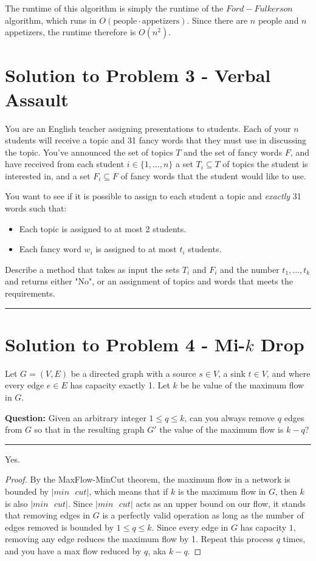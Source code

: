 \documentclass[11pt]{article}
\begin{document}
The runtime of this algorithm is simply the runtime of the $Ford-Fulkerson$ algorithm, which runs in $O(\text{people} \cdot \text{appetizers})$. Since there are $n$ people and $n$ appetizers, the runtime therefore is $O(n^2)$.

\pagebreak

\section*{Solution to Problem 3 - Verbal Assault}

You are an English teacher assigning presentations to students. Each of your $n$ students will receive a topic and 31 fancy words that they must use in discussing the topic. You've announced the set of topics $T$ and the set of fancy words $F$, and have received from each student $i \in \{1, ..., n\}$ a set $T_i \subseteq T$ of topics the student is interested in, and a set $F_i \subseteq F$ of fancy words that the student would like to use.

You want to see if it is possible to assign to each student a topic and \textit{exactly} 31 words such that:
\begin{itemize}
	\item Each topic is assigned to at most 2 students.
	\item Each fancy word $w_i$ is assigned to at most $t_i$ students.
\end{itemize}

Describe a method that takes as input the sets $T_i$ and $F_i$ and the number $t_1, ..., t_k$ and returns either "No", or an assignment of topics and words that meets the requirements.

\noindent\rule{17cm}{0.4pt}

\pagebreak

\section*{Solution to Problem 4 - Mi-$k$ Drop}

Let $G = (V,E)$ be a directed graph with a source $s \in V$, a sink $t \in V$, and where every edge $e \in E$ has capacity exactly 1. Let $k$ be he value of the maximum flow in $G$.

\textbf{Question:} Given an arbitrary integer $1 \leq q \leq k$, can you always remove $q$ edges from $G$ so that in the resulting graph $G'$ the value of the maximum flow is $k-q$?

\noindent\rule{17cm}{0.4pt}

Yes.

\begin{proof}
By the MaxFlow-MinCut theorem, the maximum flow in a network is bounded by $|min\text{ }cut|$, which means that if $k$ is the maximum flow in $G$, then $k$ is also $|min\text{ }cut|$. Since $|min\text{ }cut|$ acts as an upper bound on our flow, it stands that removing edges in $G$ is a perfectly valid operation as long as the number of edges removed is bounded by $1 \leq q \leq k$. Since every edge in $G$ has capacity $1$, removing any edge  reduces the maximum flow by 1. Repeat this process $q$ times, and you have a max flow reduced by $q$, aka $k-q$.
\end{proof} 
\end{document}
